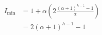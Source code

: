 \documentclass{beamer}
\begin{document}
\begin{frame}
\begin{columns}
\begin{column}{\textlecolumn}
            \vspace{-0.75cm}
            \begin{block}{}
                \[
                    \begin{aligned}
                        I_{\text{min}} &= 1 + \alpha\left(2\frac{\left(\alpha + 1\right)^{h - 1} - 1}{\alpha}\right) \\
                        &= 2\left(\alpha + 1\right)^{h - 1} - 1
                    \end{aligned}
                \]
            \end{block}
        \end{column}
        \begin{column}{\textricolumn}
        \end{column}
    \end{columns}

    \framebreak


\end{frame}
\end{document}
